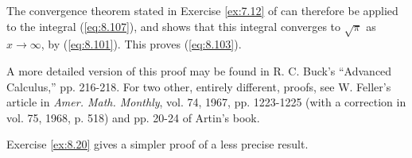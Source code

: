 The convergence theorem stated in Exercise \ref{ex:7.12} of can therefore be applied to the integral (\ref{eq:8.107}), and shows that this integral converges to $\sqrt{\pi}$ as $x \rightarrow \infty$, by (\ref{eq:8.101}).
This proves (\ref{eq:8.103}).

A more detailed version of this proof may be found in R. C. Buck's ``Advanced Calculus,''\cite{BUCK1962} pp. 216-218. 
For two other, entirely different, proofs,
see W. Feller's article in \emph{Amer. Math. Monthly}, vol. 74, 1967, pp. 1223-1225
(with a correction in vol. 75, 1968, p. 518) and pp. 20-24 of Artin's book\cite{ARTIN1964}.

Exercise \ref{ex:8.20} gives a simpler proof of a less precise result.
